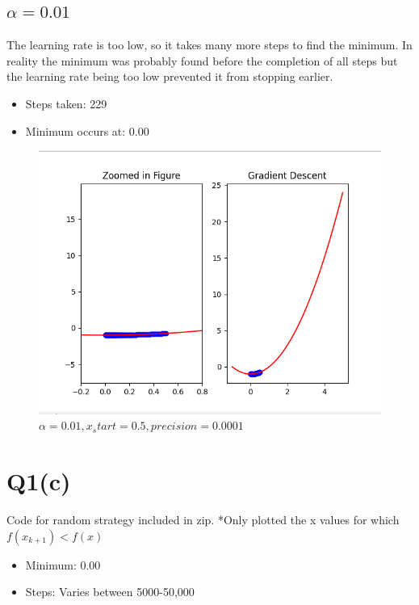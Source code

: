 \documentclass{article}
\begin{document}
    \pagebreak

        \subsection{$\alpha = 0.01$}
            The learning rate is too low, so it takes many more steps to find the minimum. In reality
            the minimum was probably found before the completion of all steps but the learning rate being too low
            prevented it from stopping earlier.
            \begin{itemize}
                \item Steps taken: 229
                \item Minimum occurs at: 0.00
            \end{itemize}
            \begin{figure}[h]
                \includegraphics[scale=0.5]{b.png}
                \caption{$\alpha = 0.01, x_start = 0.5, precision = 0.0001$}
            \end{figure}           

    \pagebreak

    \section*{Q1(c)}
        Code for random strategy included in zip. \break
        *Only plotted the x values for which $f(x_{k+1}) < f(x)$

        \begin{itemize}
            \item Minimum: 0.00
            \item Steps: Varies between 5000-50,000
        \end{itemize}
\end{document}
